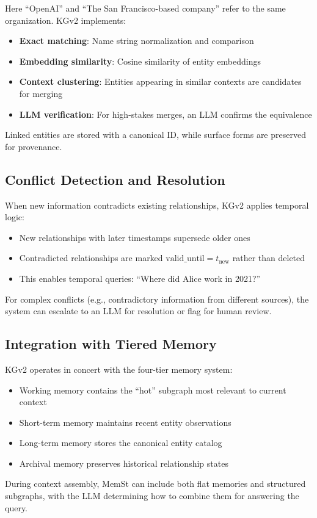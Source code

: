 Here ``OpenAI'' and ``The San Francisco-based company'' refer to the same organization. KGv2 implements:

\begin{itemize}
    \item \textbf{Exact matching}: Name string normalization and comparison
    \item \textbf{Embedding similarity}: Cosine similarity of entity embeddings
    \item \textbf{Context clustering}: Entities appearing in similar contexts are candidates for merging
    \item \textbf{LLM verification}: For high-stakes merges, an LLM confirms the equivalence
\end{itemize}

Linked entities are stored with a canonical ID, while surface forms are preserved for provenance.

\subsection{Conflict Detection and Resolution}

When new information contradicts existing relationships, KGv2 applies temporal logic:

\begin{itemize}
    \item New relationships with later timestamps supersede older ones
    \item Contradicted relationships are marked $\text{valid\_until} = t_{\text{new}}$ rather than deleted
    \item This enables temporal queries: ``Where did Alice work in 2021?''
\end{itemize}

For complex conflicts (e.g., contradictory information from different sources), the system can escalate to an LLM for resolution or flag for human review.

\subsection{Integration with Tiered Memory}

KGv2 operates in concert with the four-tier memory system:

\begin{itemize}
    \item Working memory contains the ``hot'' subgraph most relevant to current context
    \item Short-term memory maintains recent entity observations
    \item Long-term memory stores the canonical entity catalog
    \item Archival memory preserves historical relationship states
\end{itemize}

During context assembly, MemSt can include both flat memories and structured subgraphs, with the LLM determining how to combine them for answering the query.
